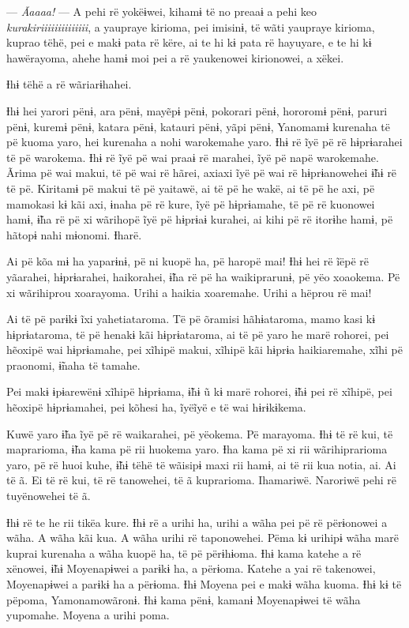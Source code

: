 --- \textit{Ãaaaa!} --- A pehi rë yokëɨwei, kihamɨ të no preaaɨ a pehi keo
\textit{kurakiriiiiiiiiiiiiii}, a yaupraye kirioma, pei imisinɨ, të wãti yaupraye
kirioma, kuprao tëhë, pei e makɨ pata rë këre, ai te hi kɨ pata rë
hayuyare, e te hi kɨ hawërayoma, ahehe hamɨ moi pei a rë yaukenowei
kirionowei, a xëkei. 

Ɨhɨ tëhë a rë wãriarɨhahei. 

Ɨhɨ hei yarori pënɨ, ara pënɨ, mayẽpɨ pënɨ, pokorari pënɨ, hororomɨ
pënɨ, paruri pënɨ, kuremɨ pënɨ, katara pënɨ, katauri pënɨ, yãpi pënɨ,
Yanomamɨ kurenaha të pë kuoma yaro, hei kurenaha a nohi warokemahe yaro.
Ɨhɨ rë ĩyë pë rë hɨprɨarahei të pë warokema. Ɨhɨ rë ĩyë pë wai praaɨ rë
marahei, ĩyë pë napë warokemahe. Ãrima pë wai makui, të pë wai rë hãrei,
axiaxi ĩyë pë wai rë hɨprɨanowehei ɨ̃hɨ rë të pë. Kiritamɨ pë makui të pë
yaitawë, ai të pë he wakë, ai të pë he axi, pë mamokasi kɨ kãi axi,
ɨnaha pë rë kure, ĩyë pë hɨprɨamahe, të pë rë kuonowei hamɨ, ɨ̃ha rë pë
xi wãrihopë ĩyë pë hɨprɨaɨ kurahei, ai kihi pë rë itorɨhe hamɨ, pë
hãtopɨ nahi mɨonomi. Ɨharë. 

Ai pë kõa mɨ ha yaparɨnɨ, pë ni kuopë ha, pë haropë mai! Ɨhɨ hei rë ĩëpë
rë yãarahei, hɨprɨarahei, haikorahei, ɨ̃ha rë pë ha waikiprarunɨ, pë yëo
xoaokema. Pë xi wãrihiprou xoarayoma. Urihi a haikia xoaremahe. Urihi a
hëprou rë mai! 

Ai të pë parɨkɨ ĩxi yahetiataroma. Të pë õramisi hãhɨataroma, mamo kasi
kɨ hɨprɨataroma, të pë henakɨ kãi hɨprɨataroma, ai të pë yaro he marë
rohorei, pei hẽoxipë wai hɨprɨamahe, pei xĩhipë makui, xĩhipë kãi hɨprɨa
haikiaremahe, xĩhi pë praonomi, ɨ̃naha të tamahe. 

Pei makɨ ɨpɨarewënɨ xĩhipë hɨprɨama, ɨ̃hɨ ũ kɨ marë rohorei, ɨ̃hɨ pei rë
xĩhipë, pei hẽoxipë hɨprɨamahei, pei kõhesi ha, ĩyëĩyë e të wai
hɨrɨkɨkema. 

Kuwë yaro ɨ̃ha ĩyë pë rë waikarahei, pë yëokema. Pë marayoma. Ɨhɨ të rë
kui, të maprarioma, ɨ̃ha kama pë rii huokema yaro. Ɨha kama pë xi rii
wãrihiprarioma yaro, pë rë huoi kuhe, ɨ̃hɨ tëhë të wãisipɨ maxi rii hamɨ,
ai të rii kua notia, ai. Ai të ã. Ei të rë kui, të rë tanowehei, të ã
kuprarioma. Ihamariwë. Naroriwë pehi rë tuyënowehei të ã. 

Ɨhɨ rë te he rii tikëa kure. Ɨhɨ rë a urihi ha, urihi a wãha pei pë rë
përɨonowei a wãha. A wãha kãi kua. A wãha urihi rë taponowehei. Pëma kɨ
urihipɨ wãha marë kuprai kurenaha a wãha kuopë ha, të pë përɨhɨoma. Ɨhɨ
kama katehe a rë xënowei, ɨ̃hɨ Moyenapɨwei a parɨkɨ ha, a përɨoma. Katehe
a yai rë takenowei, Moyenapɨwei a parɨkɨ ha a përɨoma. Ɨhɨ Moyena pei e
makɨ wãha kuoma. Ɨhɨ kɨ të pëpoma, Yamonamowãronɨ. Ɨhɨ kama pënɨ, kamanɨ
Moyenapɨwei të wãha yupomahe. Moyena a urihi poma. 

